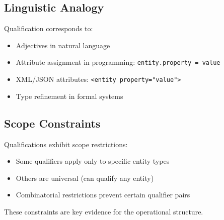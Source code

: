 \subsection{Linguistic Analogy}

Qualification corresponds to:
\begin{itemize}
    \item Adjectives in natural language
    \item Attribute assignment in programming: \texttt{entity.property = value}
    \item XML/JSON attributes: \texttt{<entity property="value">}
    \item Type refinement in formal systems
\end{itemize}

\subsection{Scope Constraints}

Qualifications exhibit scope restrictions:
\begin{itemize}
    \item Some qualifiers apply only to specific entity types
    \item Others are universal (can qualify any entity)
    \item Combinatorial restrictions prevent certain qualifier pairs
\end{itemize}

These constraints are key evidence for the operational structure.
